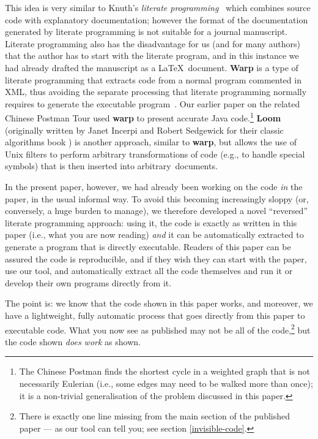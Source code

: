 \documentclass[preprint,times]{elsarticle}
\def\name#1{\textbf{#1}}
\begin{document}
This idea is very similar to Knuth's \emph{literate programming}~\cite{litprog} which combines source code with explanatory documentation; however the format of the documentation generated by literate programming is not suitable for a journal manuscript. Literate programming also has the disadvantage for us (and for many authors) that the author has to start with the literate program, and in this instance we had already drafted the manuscript as a \LaTeX\ document. \name{Warp\/} is a type of literate programming that extracts code from a normal program commented in XML, thus avoiding the separate processing that literate programming normally requires to generate the executable program~\cite{warp}. Our earlier paper %
on the related Chinese Postman Tour \cite{cpp} used \name{warp\/} to present accurate Java code.\footnote{The Chinese Postman finds the shortest cycle in a weighted graph that is not necessarily Eulerian (i.e., some edges may need to be walked more than once); it is a non-trivial generalisation of the problem discussed in this paper.} \name{Loom\/} \cite{loom} (originally written by Janet Incerpi and Robert Sedgewick for their classic algorithms book \cite{sedgeoriginalbook}) is another approach, similar to \name{warp\/}, but allows the use of Unix filters to perform arbitrary transformations of code (e.g., to handle special symbols) that is then inserted into arbitrary~documents. 

In the present paper, however, we had already been working on the code \emph{in\/} the paper, in the usual informal way. To avoid this becoming increasingly sloppy (or, conversely, a huge burden to manage), we therefore developed a novel ``reversed'' literate programming approach: using it, the code is exactly as written in this paper (i.e., what you are now reading) \emph{and\/} it can be automatically extracted to generate a program that is directly executable. Readers of this paper can be assured the code is reproducible, and if they wish they can start with the paper, use our tool, and automatically extract all the code themselves and run it or develop their own programs directly from it.

The point is: we know that the code shown in this paper works, and moreover, we have a lightweight, fully automatic process that goes directly from this paper to executable code. What you now see as published may not be all of the code,\footnote{There is exactly one line missing from the main section of the published paper --- as our tool can tell you; see section \ref{invisible-code}.} but the code shown \emph{does work\/} as shown.  
\end{document}

